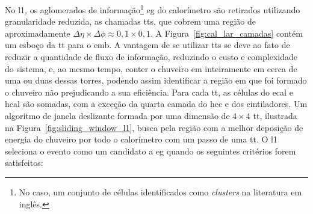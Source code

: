 No \gls{l1}, os aglomerados de informação\footnote{No caso, um conjunto de
células identificados como \emph{clusters} na literatura em inglês.} \gls{eg} do calorímetro são retirados
utilizando granularidade reduzida, as chamadas \glspl{tt}, que cobrem uma região
de aproximadamente $\Delta\eta\times\Delta\phi\approx0,1\times0,1$.
A Figura~\ref{fig:cal_lar_camadas} contém um esboço da \gls{tt} para o
\gls{emb}. A vantagem de se utilizar \glspl{tt} se deve ao
fato de reduzir a quantidade de fluxo de informação, reduzindo o custo e
complexidade do sistema, e, ao mesmo tempo, conter o chuveiro \gls{em} inteiramente 
em cerca de uma ou duas dessas torres, podendo
assim identificar a região em que foi formado o chuveiro não prejudicando a sua
eficiência. Para cada \gls{tt}, as células do \gls{ecal} e \gls{hcal} são somadas, com a
exceção da quarta camada do \gls{hec} e dos cintiladores.
Um algoritmo de janela deslizante formada por uma dimensão de $4\times4$
\gls{tt}, ilustrada na Figura~\ref{fig:sliding_window_l1}, 
busca pela região com a melhor deposição de energia do chuveiro por
todo o calorímetro com um passo de uma \gls{tt}.
O \gls{l1} seleciona o evento como um candidato a \gls{eg} 
quando os seguintes critérios forem satisfeitos:

